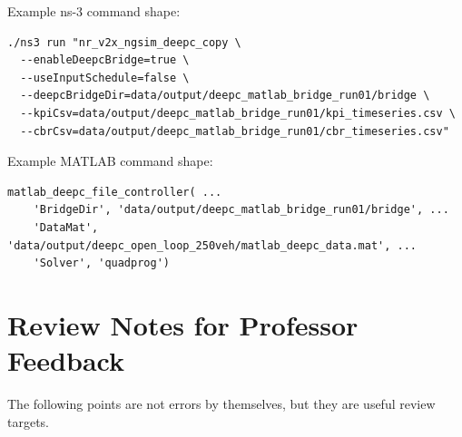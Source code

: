 \documentclass[11pt]{article}
\begin{document}
Example ns-3 command shape:

\begin{lstlisting}[style=textstyle]
./ns3 run "nr_v2x_ngsim_deepc_copy \
  --enableDeepcBridge=true \
  --useInputSchedule=false \
  --deepcBridgeDir=data/output/deepc_matlab_bridge_run01/bridge \
  --kpiCsv=data/output/deepc_matlab_bridge_run01/kpi_timeseries.csv \
  --cbrCsv=data/output/deepc_matlab_bridge_run01/cbr_timeseries.csv"
\end{lstlisting}

Example MATLAB command shape:

\begin{lstlisting}[style=matlabstyle]
matlab_deepc_file_controller( ...
    'BridgeDir', 'data/output/deepc_matlab_bridge_run01/bridge', ...
    'DataMat', 'data/output/deepc_open_loop_250veh/matlab_deepc_data.mat', ...
    'Solver', 'quadprog')
\end{lstlisting}

\section{Review Notes for Professor Feedback}

The following points are not errors by themselves, but they are useful review
targets.
\end{document}
